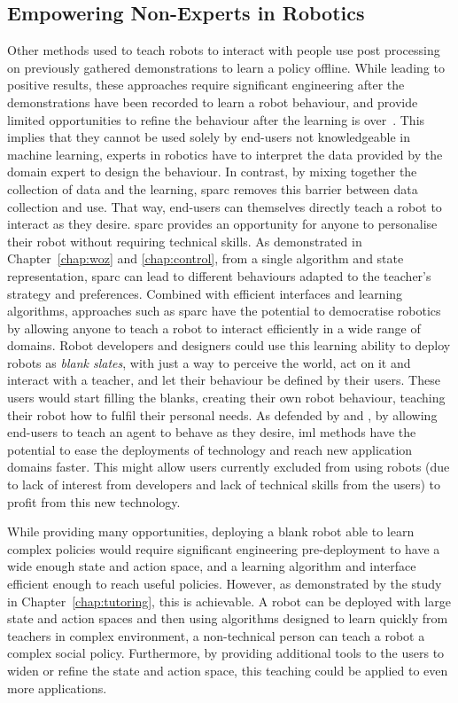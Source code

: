 \subsection{Empowering Non-Experts in Robotics}

Other methods used to teach robots to interact with people use post processing on previously gathered demonstrations to learn a policy offline. While leading to positive results, these approaches require significant engineering after the demonstrations have been recorded to learn a robot behaviour, and provide limited opportunities to refine the behaviour after the learning is over~\citep{liu2014train,sequeira2016discovering}. This implies that they cannot be used solely by end-users not knowledgeable in machine learning, experts in robotics have to interpret the data provided by the domain expert to design the behaviour. In contrast, by mixing together the collection of data and the learning, \gls{sparc} removes this barrier between data collection and use. That way, end-users can themselves directly teach a robot to interact as they desire.
\gls{sparc} provides an opportunity for anyone to personalise their robot without requiring technical skills. As demonstrated in Chapter~\ref{chap:woz} and \ref{chap:control}, from a single algorithm and state representation, \gls{sparc} can lead to different behaviours adapted to the teacher's strategy and preferences. Combined with efficient interfaces and learning algorithms, approaches such as \gls{sparc} have the potential to democratise robotics by allowing anyone to teach a robot to interact efficiently in a wide range of domains. Robot developers and designers could use this learning ability to deploy robots as \emph{blank slates}, with just a way to perceive the world, act on it and interact with a teacher, and let their behaviour be defined by their users. These users would start filling the blanks, creating their own robot behaviour, teaching their robot how to fulfil their personal needs. As defended by \cite{fails2003interactive} and \cite{amershi2014power}, by allowing end-users to teach an agent to behave as they desire, \gls{iml} methods have the potential to ease the deployments of technology and reach new application domains faster. This might allow users currently excluded from using robots (due to lack of interest from developers and lack of technical skills from the users) to profit from this new technology.

While providing many opportunities, deploying a blank robot able to learn complex policies would require significant engineering pre-deployment to have a wide enough state and action space, and a learning algorithm and interface efficient enough to reach useful policies. However, as demonstrated by the study in Chapter~\ref{chap:tutoring}, this is achievable. A robot can be deployed with large state and action spaces and then using algorithms designed to learn quickly from teachers in complex environment, a non-technical person can teach a robot a complex social policy. Furthermore, by providing additional tools to the users to widen or refine the state and action space, this teaching could be applied to even more applications.

